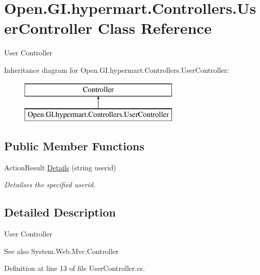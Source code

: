 \hypertarget{class_open_1_1_g_i_1_1hypermart_1_1_controllers_1_1_user_controller}{}\section{Open.\+G\+I.\+hypermart.\+Controllers.\+User\+Controller Class Reference}
\label{class_open_1_1_g_i_1_1hypermart_1_1_controllers_1_1_user_controller}


User Controller  


Inheritance diagram for Open.\+G\+I.\+hypermart.\+Controllers.\+User\+Controller\+:\begin{figure}[H]
\begin{center}
\leavevmode
\includegraphics[height=2.000000cm]{class_open_1_1_g_i_1_1hypermart_1_1_controllers_1_1_user_controller}
\end{center}
\end{figure}
\subsection*{Public Member Functions}
\begin{DoxyCompactItemize}
\item 
Action\+Result \hyperlink{class_open_1_1_g_i_1_1hypermart_1_1_controllers_1_1_user_controller_a56b577651faefd265aca298204e43ef7}{Details} (string userid)
\begin{DoxyCompactList}\small\item\em Detailses the specified userid. \end{DoxyCompactList}\end{DoxyCompactItemize}


\subsection{Detailed Description}
User Controller 

\begin{DoxySeeAlso}{See also}
System.\+Web.\+Mvc.\+Controller


\end{DoxySeeAlso}


Definition at line 13 of file User\+Controller.\+cs.



